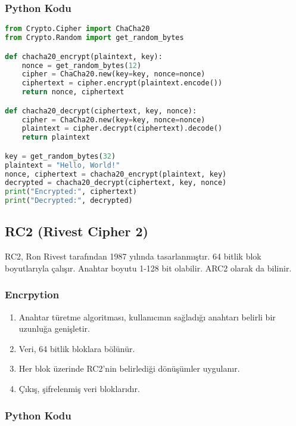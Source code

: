 \subsubsection{Python Kodu}

\begin{lstlisting}[language=Python]
from Crypto.Cipher import ChaCha20
from Crypto.Random import get_random_bytes

def chacha20_encrypt(plaintext, key):
    nonce = get_random_bytes(12)
    cipher = ChaCha20.new(key=key, nonce=nonce)
    ciphertext = cipher.encrypt(plaintext.encode())
    return nonce, ciphertext

def chacha20_decrypt(ciphertext, key, nonce):
    cipher = ChaCha20.new(key=key, nonce=nonce)
    plaintext = cipher.decrypt(ciphertext).decode()
    return plaintext

key = get_random_bytes(32)
plaintext = "Hello, World!"
nonce, ciphertext = chacha20_encrypt(plaintext, key)
decrypted = chacha20_decrypt(ciphertext, key, nonce)
print("Encrypted:", ciphertext)
print("Decrypted:", decrypted)
\end{lstlisting}

\newpage

\subsection{RC2 (Rivest Cipher 2)}

RC2, Ron Rivest tarafından 1987 yılında tasarlanmıştır. 64 bitlik blok boyutlarıyla çalışır. Anahtar boyutu 1-128 bit olabilir. ARC2 olarak da bilinir.

\subsubsection{Encrpytion}

\begin{enumerate}
    \item Anahtar türetme algoritması, kullanıcının sağladığı anahtarı belirli bir uzunluğa genişletir.
    \item Veri, 64 bitlik bloklara bölünür.
    \item Her blok üzerinde RC2'nin belirlediği dönüşümler uygulanır.
    \item Çıkış, şifrelenmiş veri bloklarıdır.
\end{enumerate}

\subsubsection{Python Kodu}

